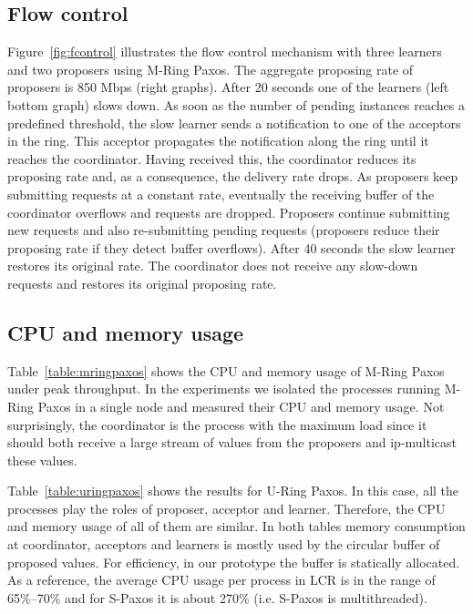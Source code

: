 \documentclass[final,3p,times,twocolumn,authoryear]{elsarticle}
\begin{document}
\subsection{Flow control}
\label{sec:exp:flow-control}

Figure~\ref{fig:fcontrol} illustrates the flow control mechanism with three learners and two proposers using M-Ring Paxos. 
The aggregate proposing rate of proposers is 850 Mbps (right graphs). 
After 20 seconds one of the learners (left bottom graph) slows down. 
As soon as the number of pending instances reaches a predefined threshold, the slow learner sends a notification to one of the acceptors in the ring. 
This acceptor propagates the notification along the ring until it reaches the coordinator. 
Having received this, the coordinator reduces its proposing rate and, as a consequence, the delivery rate drops. 
As proposers keep submitting requests at a constant rate, eventually the receiving buffer of the coordinator overflows and requests are dropped. 
Proposers continue submitting new requests and also re-submitting pending requests (proposers reduce their proposing rate if they detect buffer overflows). 
After 40 seconds the slow learner restores its original rate. 
The coordinator does not receive any slow-down requests and restores its original proposing rate.






\subsection{CPU and memory usage}
\label{sec:cpumem}

Table~\ref{table:mringpaxos} shows the CPU and memory usage of M-Ring Paxos under peak throughput. In the experiments we isolated the processes running M-Ring Paxos in a single node and measured their CPU and memory usage. Not surprisingly, the coordinator is the process with the maximum load since it should both receive a large stream of values from the proposers and ip-multicast these values. 

Table~\ref{table:uringpaxos} shows the results for U-Ring Paxos. In this case, all the processes play the roles of proposer, acceptor and learner. Therefore, the CPU and memory usage of all of them are similar. In both tables memory consumption at coordinator, acceptors and learners is mostly used by the circular buffer of proposed values. For efficiency, in our prototype the buffer is statically allocated.
As a reference, the average CPU usage per process in LCR is in the range of 65\%--70\% and for S-Paxos it is about 270\% (i.e. S-Paxos is multithreaded).
\end{document}

